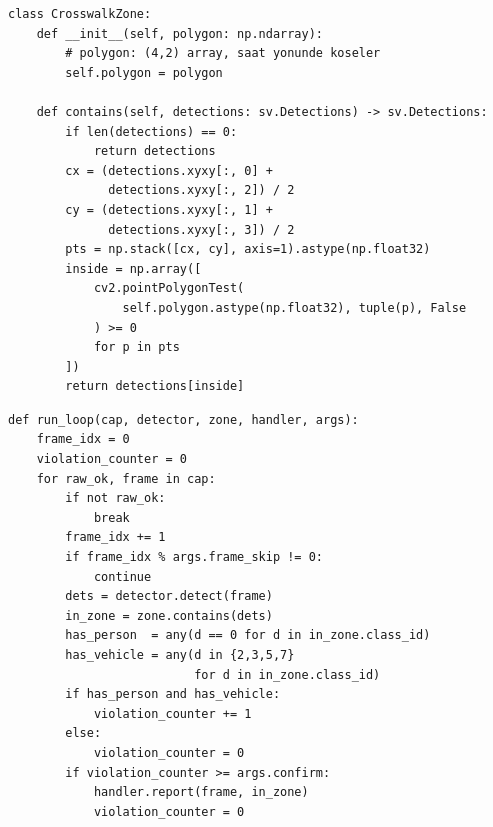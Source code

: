 \begin{lstlisting}[caption={CrosswalkZone -- polygon içi tespit filtresi}, label={lst:zone}]
class CrosswalkZone:
    def __init__(self, polygon: np.ndarray):
        # polygon: (4,2) array, saat yonunde koseler
        self.polygon = polygon

    def contains(self, detections: sv.Detections) -> sv.Detections:
        if len(detections) == 0:
            return detections
        cx = (detections.xyxy[:, 0] +
              detections.xyxy[:, 2]) / 2
        cy = (detections.xyxy[:, 1] +
              detections.xyxy[:, 3]) / 2
        pts = np.stack([cx, cy], axis=1).astype(np.float32)
        inside = np.array([
            cv2.pointPolygonTest(
                self.polygon.astype(np.float32), tuple(p), False
            ) >= 0
            for p in pts
        ])
        return detections[inside]
\end{lstlisting}

\begin{lstlisting}[caption={main.py -- Ana durum makinesi döngüsü (özet)}, label={lst:main}]
def run_loop(cap, detector, zone, handler, args):
    frame_idx = 0
    violation_counter = 0
    for raw_ok, frame in cap:
        if not raw_ok:
            break
        frame_idx += 1
        if frame_idx % args.frame_skip != 0:
            continue
        dets = detector.detect(frame)
        in_zone = zone.contains(dets)
        has_person  = any(d == 0 for d in in_zone.class_id)
        has_vehicle = any(d in {2,3,5,7}
                          for d in in_zone.class_id)
        if has_person and has_vehicle:
            violation_counter += 1
        else:
            violation_counter = 0
        if violation_counter >= args.confirm:
            handler.report(frame, in_zone)
            violation_counter = 0
\end{lstlisting}

